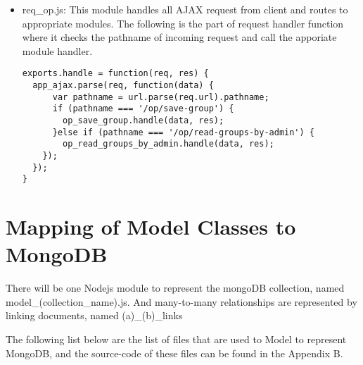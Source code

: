 \begin{itemize}
\item req{\_}op.js: This module handles all AJAX request from client and routes to appropriate modules. The following is the part of request handler function where it checks the pathname of incoming request and call the apporiate module handler.

\begin{lstlisting}
exports.handle = function(req, res) {
  app_ajax.parse(req, function(data) {
      var pathname = url.parse(req.url).pathname;
      if (pathname === '/op/save-group') {
        op_save_group.handle(data, res);
      }else if (pathname === '/op/read-groups-by-admin') {
        op_read_groups_by_admin.handle(data, res);
    });
  });
}
\end{lstlisting}
 
\end{itemize}

\section{Mapping of Model Classes to MongoDB}
There will be one Nodejs module to represent the mongoDB collection, named model{\_}(collection{\_}name).js. And many-to-many relationships are represented by linking documents, named (a){\_}(b){\_}links

The following list below are the list of files that are used to Model to represent MongoDB, and the source-code of these files can be found in the Appendix B.


